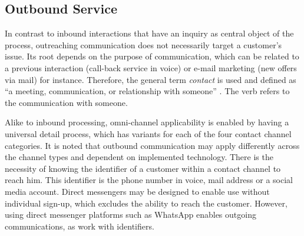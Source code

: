 	 
	 
	 
	 
	 
	 
	 \subsection{Outbound Service}
	 
	 In contrast to inbound interactions that have an inquiry as central object of the process, outreaching communication does not necessarily target a customer's issue. Its root depends on the purpose of communication, which can be related to a previous interaction (call-back service in voice) or e-mail marketing (new offers via mail) for instance. Therefore, the general term \textit{contact} is used and defined as \enquote{a meeting, communication, or relationship with someone} \citep{oxfordcontact}. The verb refers to the communication with someone.
	 
	 Alike to inbound processing, omni-channel applicability is enabled by having a universal detail process, which has variants for each of the four contact channel categories. It is noted that outbound communication may apply differently across the channel types and dependent on implemented technology. There is the necessity of knowing the identifier of a customer within a contact channel to reach him. This identifier is the phone number in voice, mail address or a social media account. Direct messengers may be designed to enable use without individual sign-up, which excludes the ability to reach the customer. However, using direct messenger platforms such as WhatsApp enables outgoing communications, as work with identifiers. 
	 
